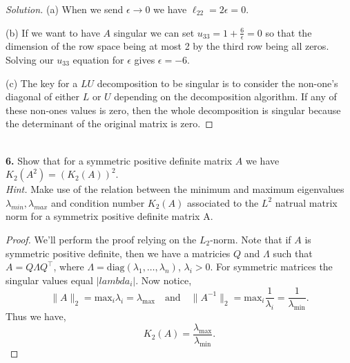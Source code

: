 \documentclass[12pt]{amsart}
\newenvironment{solution}
{\begin{proof}[Solution]}
{\end{proof}}
\begin{document}
\begin{onehalfspace}
\begin{solution}
            (a) When we send $\epsilon\rightarrow 0$ we have $\ell_{22} = 2\epsilon = 0$.

            (b) If we want to have $A$ singular we can set $u_{33} = 1 +\frac{6}{\epsilon} = 0$ so that the dimension
            of the row space being at most 2 by the third row being all zeros.
            Solving our $u_{33}$ equation for $\epsilon$ gives $\epsilon = -6$.

            (c) The key for a $LU$ decomposition to be singular is to consider the non-one's diagonal of either $L$ or
            $U$ depending on the decomposition algorithm.
            If any of these non-ones values is zero, then the whole decomposition is singular because the determinant
            of the original matrix is zero.
        \end{solution}

        \quad\\
        \noindent\textbf{6.} Show that for a symmetric positive definite matrix $A$ we have $K_2(A^2)=(K_2(A))^2$.\\
        \emph{Hint.} Make use of the relation between the minimum and maximum eigenvalues $\lambda_{min},\lambda_{max}$
        and condition number $K_2(A)$ associated to the $L^2$ natrual matrix norm for a symmetrix positive definite
        matrix A.
        \begin{proof}
            We'll perform the proof relying on the $L_2$-norm.
            Note that if $A$ is symmetric positive definite, then we have a matricies $Q$ and $\Lambda$ such that
            $A=Q\Lambda Q^\top$, where $\Lambda = \text{diag}(\lambda_1,\ldots,\lambda_n)$, $\lambda_i>0$.
            For symmetric matrices the singular values equal $|lambda_i|$.
            Now notice,
            \begin{displaymath}
                \|A\|_2 = \text{max}_i \lambda_i = \lambda_{\text{max}}\quad\text{and}\quad
                \|A^{-1}\|_2 = \text{max}_{i}\frac{1}{\lambda_i} = \frac{1}{\lambda_{\text{min}}}.
            \end{displaymath}
            Thus we have,
            \begin{displaymath}
                K_2(A) = \frac{\lambda_{\text{max}}}{\lambda_{\text{min}}}.
            \end{displaymath}


\end{proof}
\end{onehalfspace}
\end{document}
